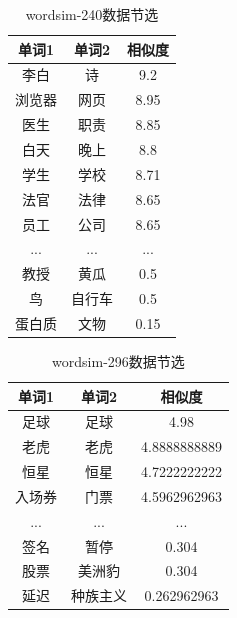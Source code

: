 \documentclass{standalone}
\begin{document}
\begin{table}[h]
    \caption{wordsim-240数据节选}
    \begin{tabular}{|c|c|c|}
        \hline
        单词1 & 单词2 & 相似度 \\
        \hline
        李白 & 诗 & 9.2 \\
        \hline
        浏览器 & 网页 & 8.95 \\
        \hline
        医生 & 职责 & 8.85 \\
        \hline
        白天 & 晚上 & 8.8 \\
        \hline
        学生 & 学校 & 8.71 \\
        \hline
        法官 & 法律 & 8.65 \\
        \hline
        员工 & 公司 & 8.65 \\
        \hline
        ... & ... & ... \\
        \hline
        教授 & 黄瓜 & 0.5 \\
        \hline
        鸟 & 自行车 & 0.5 \\
        \hline
        蛋白质 & 文物 & 0.15 \\
        \hline
    \end{tabular}
    \label{wordsim-240_form}
    \end{table}

\begin{table}[h]
\caption{wordsim-296数据节选}
\begin{tabular}{|c|c|c|}
    \hline
    单词1 & 单词2 & 相似度 \\
    \hline
    足球 & 足球 & 4.98 \\
    \hline
    老虎 & 老虎 & 4.8888888889 \\
    \hline
    恒星 & 恒星 & 4.7222222222 \\
    \hline
    入场券 & 门票 & 4.5962962963 \\
    \hline
    ... & ... & ... \\
    \hline
    签名 & 暂停 & 0.304 \\
    \hline
    股票 & 美洲豹 & 0.304 \\
    \hline
    延迟 & 种族主义 & 0.262962963 \\
    \hline
\end{tabular}
\label{wordsim-296_form}
\end{table}
\end{document}
